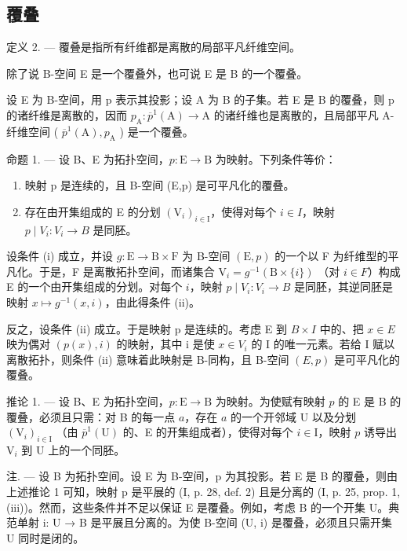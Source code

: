 \subsection{覆叠}

定义 2. --- 覆叠是指所有纤维都是离散的局部平凡纤维空间。

除了说 B-空间 E 是一个覆叠外，也可说 E 是 B 的一个覆叠。

设 E 为 B-空间，用 p 表示其投影；设 A 为 B 的子集。若 E 是 B 的覆叠，则 p 的诸纤维是离散的，因而 \(p_{\mathrm{A}} \colon \overline{p}^{1}(\mathrm{A}) \to \mathrm{A}\) 的诸纤维也是离散的，且局部平凡 A-纤维空间 ( \(\overline{p}^{1}(\mathrm{A}), p_{\mathrm{A}}\) ) 是一个覆叠。

命题 1. --- 设 B、E 为拓扑空间，\(p\colon \mathrm{E}\to \mathrm{B}\) 为映射。下列条件等价：

\begin{enumerate}
\def\labelenumi{(\roman{enumi})}
\item
  映射 p 是连续的，且 B-空间 (E,p) 是可平凡化的覆叠。
\item
  存在由开集组成的 E 的分划 \((\mathrm{V}_{i})_{i\in\mathrm{I}}\)，使得对每个 \(i\in I\)，映射 \(p\mid V_{i}\colon V_{i}\to B\) 是同胚。
\end{enumerate}

设条件 (i) 成立，并设 \(g \colon \mathrm{E} \to \mathrm{B} \times \mathrm{F}\) 为 B-空间 \((\mathrm{E}, p)\) 的一个以 F 为纤维型的平凡化。于是，F 是离散拓扑空间，而诸集合 \(\mathrm{V}_i = g^{-1}(\mathrm{B} \times \{i\})\) （对 \(i \in F\)）构成 E 的一个由开集组成的分划。对每个 \(i\)，映射 \(p \mid V_i \colon V_i \to B\) 是同胚，其逆同胚是映射 \(x \mapsto g^{-1}(x, i)\)，由此得条件 (ii)。

反之，设条件 (ii) 成立。于是映射 p 是连续的。考虑 E 到 \(B \times I\) 中的、把 \(x \in E\) 映为偶对 \((p(x), i)\) 的映射，其中 i 是使 \(x \in V_i\) 的 I 的唯一元素。若给 I 赋以离散拓扑，则条件 (ii) 意味着此映射是 B-同构，且 B-空间 \((E, p)\) 是可平凡化的覆叠。

推论 1. --- 设 B、E 为拓扑空间，\(p\colon \mathrm{E}\to \mathrm{B}\) 为映射。为使赋有映射 \(p\) 的 E 是 B 的覆叠，必须且只需：对 B 的每一点 \(a\)，存在 \(a\) 的一个开邻域 U 以及分划 \((\mathrm{V}_i)_{i\in \mathrm{I}}\) （由 \(\overline{p}^{1}(\mathrm{U})\) 的、E 的开集组成者），使得对每个 \(i\in \mathrm{I}\)，映射 \(p\) 诱导出 \(\mathrm{V}_i\) 到 U 上的一个同胚。

注. --- 设 B 为拓扑空间。设 E 为 B-空间，p 为其投影。若 E 是 B 的覆叠，则由上述推论 1 可知，映射 p 是平展的 (I, p. 28, def. 2) 且是分离的 (I, p. 25, prop. 1, (iii))。然而，这些条件并不足以保证 E 是覆叠。例如，考虑 B 的一个开集 U。典范单射 i: U → B 是平展且分离的。为使 B-空间 (U, i) 是覆叠，必须且只需开集 U 同时是闭的。

